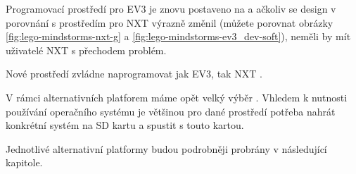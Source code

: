 Programovací prostředí pro EV3 je znovu postaveno na \labview{ }a ačkoliv se design v porovnání s prostředím pro NXT výrazně změnil (můžete porovnat obrázky \ref{fig:lego-mindstorms-nxt-g} a \ref{fig:lego-mindstorms-ev3_dev-soft}), neměli by mít uživatelé NXT s přechodem problém. 

Nové prostředí zvládne naprogramovat jak EV3, tak NXT \brick{}.


V rámci alternativních platforem máme opět velký výběr \cite{legoMindstormsWikipedia_programming-languages}. 
Vhledem k nutnosti používání operačního systému je většinou pro dané prostředí potřeba nahrát konkrétní systém na SD kartu a spustit \brick{ }s touto kartou.

Jednotlivé alternativní platformy budou podrobněji probrány v následující kapitole.
